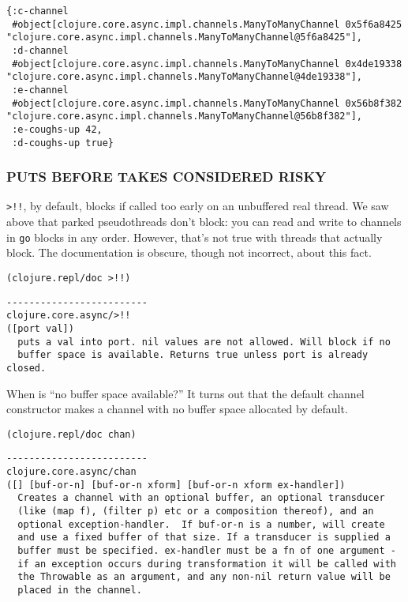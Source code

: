 \documentclass[10pt,oneside,x11names]{article}
\begin{document}
\begin{verbatim}
{:c-channel
 #object[clojure.core.async.impl.channels.ManyToManyChannel 0x5f6a8425 "clojure.core.async.impl.channels.ManyToManyChannel@5f6a8425"],
 :d-channel
 #object[clojure.core.async.impl.channels.ManyToManyChannel 0x4de19338 "clojure.core.async.impl.channels.ManyToManyChannel@4de19338"],
 :e-channel
 #object[clojure.core.async.impl.channels.ManyToManyChannel 0x56b8f382 "clojure.core.async.impl.channels.ManyToManyChannel@56b8f382"],
 :e-coughs-up 42,
 :d-coughs-up true}
\end{verbatim}

\subsubsection{PUTS BEFORE TAKES CONSIDERED RISKY}
\label{puts-before-takes-considered-risky}
\texttt{>!!}, by default, blocks if called too early on an unbuffered real
thread. We saw above that parked pseudothreads don't block: you can read
and write to channels in \texttt{go} blocks in any order. However, that's not
true with threads that actually block. The documentation is obscure,
though not incorrect, about this fact.

\begin{verbatim}
(clojure.repl/doc >!!)
\end{verbatim}

\begin{verbatim}
-------------------------
clojure.core.async/>!!
([port val])
  puts a val into port. nil values are not allowed. Will block if no
  buffer space is available. Returns true unless port is already closed.
\end{verbatim}


When is ``no buffer space available?'' It turns out that the default
channel constructor makes a channel with no buffer space allocated by
default.

\begin{verbatim}
(clojure.repl/doc chan)
\end{verbatim}

\begin{verbatim}
-------------------------
clojure.core.async/chan
([] [buf-or-n] [buf-or-n xform] [buf-or-n xform ex-handler])
  Creates a channel with an optional buffer, an optional transducer
  (like (map f), (filter p) etc or a composition thereof), and an
  optional exception-handler.  If buf-or-n is a number, will create
  and use a fixed buffer of that size. If a transducer is supplied a
  buffer must be specified. ex-handler must be a fn of one argument -
  if an exception occurs during transformation it will be called with
  the Throwable as an argument, and any non-nil return value will be
  placed in the channel.
\end{verbatim}
\end{document}

